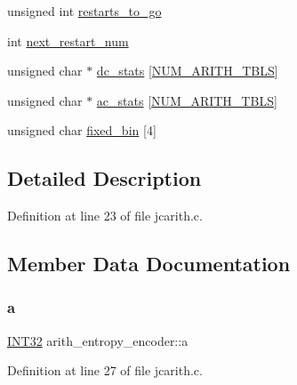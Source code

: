 \begin{DoxyCompactItemize}
\item 
unsigned int \mbox{\hyperlink{structarith__entropy__encoder_add27b20b9b70a05f49c4242844253109}{restarts\+\_\+to\+\_\+go}}
\item 
int \mbox{\hyperlink{structarith__entropy__encoder_ad523833a7d6fa8c645fb9d18de18b487}{next\+\_\+restart\+\_\+num}}
\item 
unsigned char $\ast$ \mbox{\hyperlink{structarith__entropy__encoder_add54e8b278b9eea4aa6ee85ea2de4307}{dc\+\_\+stats}} \mbox{[}\mbox{\hyperlink{jpeglib_8h_a4efb0fccc8d9db72ca18f32a26fad6ab}{N\+U\+M\+\_\+\+A\+R\+I\+T\+H\+\_\+\+T\+B\+LS}}\mbox{]}
\item 
unsigned char $\ast$ \mbox{\hyperlink{structarith__entropy__encoder_a42b982c858027226af51485fa8b0bf22}{ac\+\_\+stats}} \mbox{[}\mbox{\hyperlink{jpeglib_8h_a4efb0fccc8d9db72ca18f32a26fad6ab}{N\+U\+M\+\_\+\+A\+R\+I\+T\+H\+\_\+\+T\+B\+LS}}\mbox{]}
\item 
unsigned char \mbox{\hyperlink{structarith__entropy__encoder_a06cb7a9a6db5a785f6630e5b5606ae5d}{fixed\+\_\+bin}} \mbox{[}4\mbox{]}
\end{DoxyCompactItemize}


\subsection{Detailed Description}


Definition at line 23 of file jcarith.\+c.



\subsection{Member Data Documentation}
\mbox{\label{structarith__entropy__encoder_afdfd4096eabee6a199afe6764b1ea35a}} 
\subsubsection{\texorpdfstring{a}{a}}
{\footnotesize\ttfamily \mbox{\hyperlink{jmorecfg_8h_a0cb58e7e6f0bad369840a52e54a56ae0}{I\+N\+T32}} arith\+\_\+entropy\+\_\+encoder\+::a}



Definition at line 27 of file jcarith.\+c.

\mbox{\label{structarith__entropy__encoder_a42b982c858027226af51485fa8b0bf22}} 
